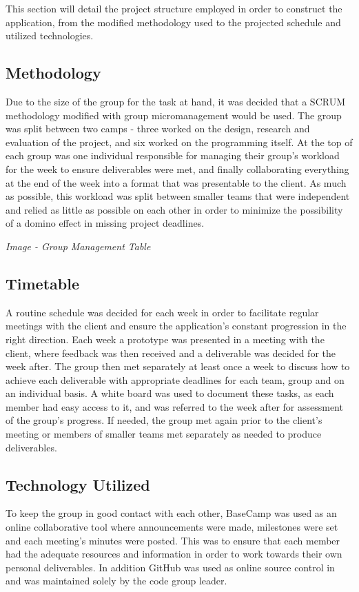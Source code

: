 This section will detail the project structure employed in order to construct the application, from the modified methodology used to the projected schedule and utilized technologies.

\subsection{Methodology}
Due to the size of the group for the task at hand, it was decided that a SCRUM methodology modified with group micromanagement would be used. The group was split between two camps - three worked on the design, research and evaluation of the project, and six worked on the programming itself. At the top of each group was one individual responsible for managing their group's workload for the week to ensure deliverables were met, and finally collaborating everything at the end of the week into a format that was presentable to the client. As much as possible, this workload was split between smaller teams that were independent and relied as little as possible on each other in order to minimize the possibility of a domino effect in missing project deadlines.

\begin{center}
\textit{Image - Group Management Table}
\end{center}

\subsection{Timetable}
A routine schedule was decided for each week in order to facilitate regular meetings with the client and ensure the application's constant progression in the right direction. Each week a prototype was presented in a meeting with the client, where feedback was then received and a deliverable was decided for the week after. The group then met separately at least once a week to discuss how to achieve each deliverable with appropriate deadlines for each team, group and on an individual basis. A white board was used to document these tasks, as each member had easy access to it, and was referred to the week after for assessment of the group's progress. If needed, the group met again prior to the client's meeting or members of smaller teams met separately as needed to produce deliverables.

\subsection{Technology Utilized}
To keep the group in good contact with each other, BaseCamp was used as an online collaborative tool where announcements were made, milestones were set and each meeting's minutes were posted. This was to ensure that each member had the adequate resources and information in order to work towards their own personal deliverables. In addition GitHub was used as online source control in and was maintained solely by the code group leader.

